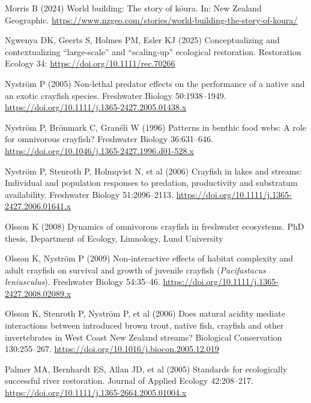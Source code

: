 \documentclass[
  12pt,
  a4paper,
  oneside]{scrbook}
\newlength{\cslhangindent}
\newenvironment{CSLReferences}[2] %
 {\begin{list}{}{%
  \setlength{\itemindent}{0pt}
  \setlength{\leftmargin}{0pt}
  \setlength{\parsep}{0pt}
  \ifodd #1
   \setlength{\leftmargin}{\cslhangindent}
   \setlength{\itemindent}{-1\cslhangindent}
  \fi
  \setlength{\itemsep}{#2\baselineskip}}}
 {\end{list}}
\renewenvironment{CSLReferences}[2]
   {\begin{list}{}{%
    \setlength{\itemindent}{0pt}
    \setlength{\leftmargin}{0pt}
    \setlength{\parsep}{0pt}
    \ifodd #1
     \setlength{\leftmargin}{\cslhangindent}
     \setlength{\itemindent}{-1\cslhangindent}
    \fi
    \setlength{\itemsep}{0.3\baselineskip}}}
   {\end{list}}%
\begin{document}
\begin{CSLReferences}{1}{1}
Morris B (2024) World building: The story of kōura. In: New Zealand
Geographic.
\url{https://www.nzgeo.com/stories/world-building-the-story-of-koura/}

Ngwenya DK, Geerts S, Holmes PM, Esler KJ (2025) Conceptualizing and
contextualizing {``large‐scale''} and {``scaling‐up''} ecological
restoration. Restoration Ecology 34:
\url{https://doi.org/10.1111/rec.70266}

Nyström P (2005) Non‐lethal predator effects on the performance of a
native and an exotic crayfish species. Freshwater Biology 50:1938--1949.
\url{https://doi.org/10.1111/j.1365-2427.2005.01438.x}

Nyström P, Brönmark C, Granéli W (1996) Patterns in benthic food webs: A
role for omnivorous crayfish? Freshwater Biology 36:631--646.
\url{https://doi.org/10.1046/j.1365-2427.1996.d01-528.x}

Nyström P, Stenroth P, Holmqvist N, et al (2006) Crayfish in lakes and
streams: Individual and population responses to predation, productivity
and substratum availability. Freshwater Biology 51:2096--2113.
\url{https://doi.org/10.1111/j.1365-2427.2006.01641.x}

Olsson K (2008) Dynamics of omnivorous crayfish in freshwater
ecosystems. PhD thesis, Department of Ecology, Limnology, Lund
University

Olsson K, Nyström P (2009) Non-interactive effects of habitat complexity
and adult crayfish on survival and growth of juvenile crayfish
({\emph{Pacifastacus leniusculus}}). Freshwater Biology 54:35--46.
\url{https://doi.org/10.1111/j.1365-2427.2008.02089.x}

Olsson K, Stenroth P, Nyström P, et al (2006) Does natural acidity
mediate interactions between introduced brown trout, native fish,
crayfish and other invertebrates in {West Coast New Zealand} streams?
Biological Conservation 130:255--267.
\url{https://doi.org/10.1016/j.biocon.2005.12.019}

Palmer MA, Bernhardt ES, Allan JD, et al (2005) Standards for
ecologically successful river restoration. Journal of Applied Ecology
42:208--217. \url{https://doi.org/10.1111/j.1365-2664.2005.01004.x}


\end{CSLReferences}
\end{document}
